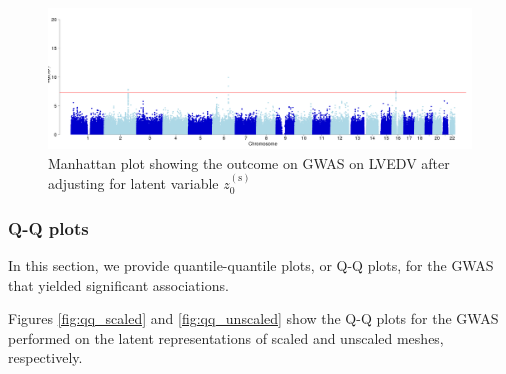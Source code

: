 \begin{figure}[ht!]
\includegraphics[width=\textwidth]{figs/supplementary/GWAS__LVEDV__std_covariates_adj_by_z5__GBR_ALL__qc__manhattan}
\caption{Manhattan plot showing the outcome on GWAS on LVEDV after adjusting for latent variable $z_0^{(\text{s})}$}
\label{fig:LVEDV_adj_by_z5}
\end{figure}


\subsubsection{Q-Q plots}
In this section, we provide quantile-quantile plots, or Q-Q plots, for the GWAS that yielded significant associations. %


Figures \ref{fig:qq_scaled} and \ref{fig:qq_unscaled} show the Q-Q plots for the GWAS performed on the latent representations of scaled and unscaled meshes, respectively.

